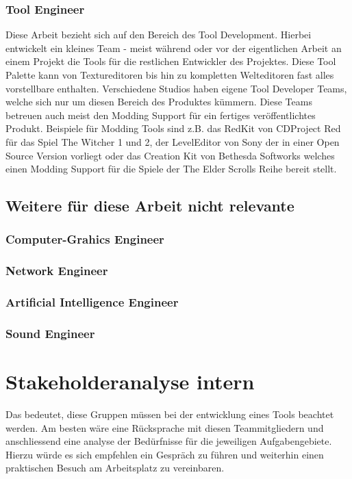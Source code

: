 \documentclass[pagesize, paper=a4, fontsize=12pt,titlepage=true, headings=small, headnosepline, abstractoff, liststotoc, nochapterprefix, plainheadsepline, twoside]{scrreprt}
\begin{document}
\subsubsection{Tool Engineer}
Diese Arbeit bezieht sich auf den Bereich des Tool Development. Hierbei entwickelt ein kleines Team - meist während oder vor der eigentlichen Arbeit an einem Projekt die Tools für die restlichen Entwickler des Projektes. Diese Tool Palette kann von Textureditoren bis hin zu kompletten Welteditoren fast alles vorstellbare enthalten. Verschiedene Studios haben eigene Tool Developer Teams, welche sich nur um diesen Bereich des Produktes kümmern. Diese Teams betreuen auch meist den Modding Support für ein fertiges veröffentlichtes Produkt. Beispiele für Modding Tools sind z.B. das RedKit von CDProject Red für das Spiel The Witcher 1 und 2, der LevelEditor von Sony der in einer Open Source Version vorliegt oder das Creation Kit von Bethesda Softworks welches einen Modding Support für die Spiele der The Elder Scrolls Reihe bereit stellt.
\subsection{Weitere für diese Arbeit nicht relevante}
\subsubsection{Computer-Grahics Engineer}

\subsubsection{Network Engineer}

\subsubsection{Artificial Intelligence Engineer}

\subsubsection{Sound Engineer}

\section{Stakeholderanalyse intern}
Das bedeutet, diese Gruppen müssen bei der entwicklung eines Tools beachtet werden. Am besten wäre eine Rücksprache mit diesen Teammitgliedern und anschliessend eine analyse der Bedürfnisse für die jeweiligen Aufgabengebiete. Hierzu würde es sich empfehlen ein Gespräch zu führen und weiterhin einen praktischen Besuch am Arbeitsplatz zu vereinbaren.
\end{document}
